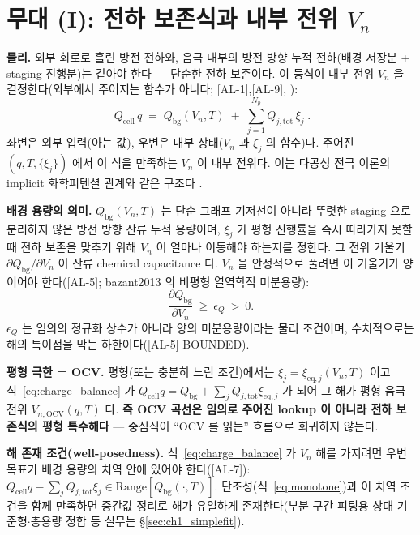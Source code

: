 \documentclass[11pt,a4paper]{article}
\newcommand{\eq}{\mathrm{eq}}
\newcommand{\bg}{\mathrm{bg}}
\newcommand{\cell}{\mathrm{cell}}
\newcommand{\OCV}{\mathrm{OCV}}
\newcommand{\tot}{\mathrm{tot}}
\newcommand{\AL}[1]{\textsf{[AL-#1]}}
\begin{document}
\section{무대 (I): 전하 보존식과 내부 전위 $V_n$}\label{sec:charge}
\textbf{물리.} 외부 회로로 흘린 방전 전하와, 음극 내부의 방전 방향 누적 전하(배경 저장분 + staging 진행분)는
같아야 한다 — 단순한 전하 보존이다. 이 등식이 내부 전위 $V_n$ 을 결정한다(외부에서 주어지는 함수가
아니다; \AL{1},\AL{9}, \cite{doyle1993,newman}):
\begin{equation}
\boxed{\;Q_\cell\,q \;=\; Q_\bg(V_n,T) \;+\; \sum_{j=1}^{N_p} Q_{j,\tot}\,\xi_j\;.}
\label{eq:charge_balance}
\end{equation}
좌변은 외부 입력(아는 값), 우변은 내부 상태($V_n$ 과 $\xi_j$ 의 함수)다. 주어진 $(q,T,\{\xi_j\})$ 에서 이
식을 만족하는 $V_n$ 이 내부 전위다. 이는 다공성 전극 이론의 implicit 화학퍼텐셜 관계와 같은 구조다
\cite{doyle1993,newman}.

\textbf{배경 용량의 의미.} $Q_\bg(V_n,T)$ 는 단순 그래프 기저선이 아니라 뚜렷한 staging 으로 분리하지 않은
방전 방향 잔류 누적 용량이며, $\xi_j$ 가 평형 진행률을 즉시 따라가지 못할 때 전하 보존을 맞추기 위해 $V_n$
이 얼마나 이동해야 하는지를 정한다. 그 전위 기울기 $\partial Q_\bg/\partial V_n$ 이 잔류 chemical
capacitance 다. $V_n$ 을 안정적으로 풀려면 이 기울기가 양이어야 한다(\AL{5}; bazant2013 의 비평형
열역학적 미분용량):
\begin{equation}
\frac{\partial Q_\bg}{\partial V_n}\ \ge\ \epsilon_Q\ >\ 0 .
\label{eq:monotone}
\end{equation}
$\epsilon_Q$ 는 임의의 정규화 상수가 아니라 양의 미분용량이라는 물리 조건이며, 수치적으로는 해의 특이점을
막는 하한이다(\AL{5} BOUNDED).

\textbf{평형 극한 = OCV.} 평형(또는 충분히 느린 조건)에서는 $\xi_j=\xi_{\eq,j}(V_n,T)$ 이고
식~\eqref{eq:charge_balance} 가 $Q_\cell q=Q_\bg+\sum_j Q_{j,\tot}\xi_{\eq,j}$ 가 되어 그 해가 평형 음극
전위 $V_{n,\OCV}(q,T)$ 다. \textbf{즉 OCV 곡선은 임의로 주어진 lookup 이 아니라 전하 보존식의 평형
특수해다} — 중심식이 ``OCV 를 읽는'' 흐름으로 회귀하지 않는다.

\textbf{해 존재 조건(well-posedness).} 식~\eqref{eq:charge_balance} 가 $V_n$ 해를 가지려면 우변 목표가 배경
용량의 치역 안에 있어야 한다(\AL{7}): $Q_\cell q-\sum_j Q_{j,\tot}\xi_j\in\mathrm{Range}[Q_\bg(\cdot,T)]$.
단조성(식~\eqref{eq:monotone})과 이 치역 조건을 함께 만족하면 중간값 정리로 해가 유일하게 존재한다(부분
구간 피팅용 상대 기준형$\cdot$총용량 정합 등 실무는 \S\ref{sec:ch1_simplefit}).
\end{document}
